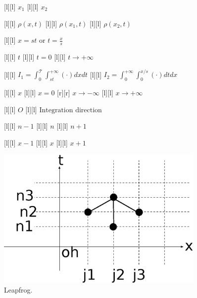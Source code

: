 \begin{figure}[ht]
	\centering
	\footnotesize


	[l] {$x_1$}
	[l] {$x_2$}

	[l] {$\rho(x,t)$}
	[l] {$\rho(x_{1},t)$}
	[l] {$\rho(x_{2},t)$}

	[l] {$\displaystyle x=st\text{ or }t=\frac{x}{s}$}

	[l] {$t$}
	[l] {$t = 0$}
	[l] {$t \rightarrow +\infty$}


	[l] {$\displaystyle I_{1} = \int_{0}^{\mathscr{T}}\int_{st}^{+\infty} \left(\cdot\right)dxdt$}
	[l] {$\displaystyle I_{2}
			=
			\int_{0}^{+\infty}\int_{0}^{x/s} \left(\cdot\right)dtdx
		$}

	[l] {$x$}
	[l] {$x=0$}
	[r] {$x\rightarrow -\infty$}
	[l] {$x\rightarrow +\infty$}

	[l] {$O$}
	[l] {$\text{Integration direction}$}

	[l] {$n-1$}
	[l] {$n$}
	[l] {$n+1$}

	[l] {$x-1$}
	[l] {$x$}
	[l] {$x+1$}


	\includegraphics[width=0.9\textwidth]{leapfrog.eps}
	\caption{Leapfrog.}
	\label{\LABEL}
\end{figure}
